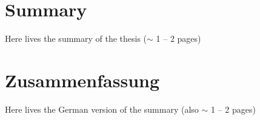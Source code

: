 \section*{Summary}

Here lives the summary of the thesis ($\sim$ 1 -- 2 pages)

\textcolor{black!35}{\lipsum[1]}

\newpage

\section*{Zusammenfassung}

Here lives the German version of the summary (also $\sim$ 1 -- 2 pages)

\textcolor{black!35}{\lipsum[1]}
